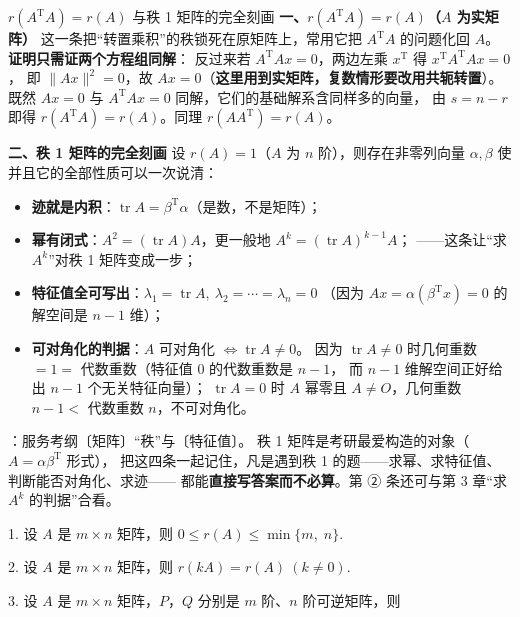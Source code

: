 \begin{fdeep}{$r(A^{\mathrm T}A)=r(A)$ 与秩 1 矩阵的完全刻画}
\textbf{一、$r(A^{\mathrm T}A)=r(A)$（$A$ 为实矩阵）}
这一条把“转置乘积”的秩锁死在原矩阵上，常用它把 $A^{\mathrm T}A$ 的问题化回 $A$。
\textbf{证明只需证两个方程组同解}：
反过来若 $A^{\mathrm T}Ax=0$，两边左乘 $x^{\mathrm T}$ 得 $x^{\mathrm T}A^{\mathrm T}Ax=0$，
即 $\lVert Ax\rVert^{2}=0$，故 $Ax=0$（\textbf{这里用到实矩阵，复数情形要改用共轭转置}）。
既然 $Ax=0$ 与 $A^{\mathrm T}Ax=0$ 同解，它们的基础解系含同样多的向量，
由 $s=n-r$ 即得 $r(A^{\mathrm T}A)=r(A)$。同理 $r(AA^{\mathrm T})=r(A)$。

\textbf{二、秩 1 矩阵的完全刻画}
设 $r(A)=1$（$A$ 为 $n$ 阶），则存在非零列向量 $\alpha,\beta$ 使
并且它的全部性质可以一次说清：
\begin{itemize}[leftmargin=2.2em,itemsep=0.22em]
\item \textbf{迹就是内积}：$\operatorname{tr}A=\beta^{\mathrm T}\alpha$（是数，不是矩阵）；
\item \textbf{幂有闭式}：$A^{2}=(\operatorname{tr}A)A$，更一般地 $A^{k}=(\operatorname{tr}A)^{k-1}A$；
      ——这条让“求 $A^{k}$”对秩 1 矩阵变成一步；
\item \textbf{特征值全可写出}：$\lambda_{1}=\operatorname{tr}A,\ \lambda_{2}=\cdots=\lambda_{n}=0$
      （因为 $Ax=\alpha(\beta^{\mathrm T}x)=0$ 的解空间是 $n-1$ 维）；
\item \textbf{可对角化的判据}：$A$ 可对角化 $\iff \operatorname{tr}A\ne0$。
      因为 $\operatorname{tr}A\ne0$ 时几何重数 $=1=$ 代数重数（特征值 $0$ 的代数重数是 $n-1$，
      而 $n-1$ 维解空间正好给出 $n-1$ 个无关特征向量）；
      $\operatorname{tr}A=0$ 时 $A$ 幂零且 $A\ne O$，几何重数 $n-1<$ 代数重数 $n$，不可对角化。
\end{itemize}
\fbref{}：服务考纲〔矩阵〕“秩”与〔特征值〕。
秩 1 矩阵是考研最爱构造的对象（$A=\alpha\beta^{\mathrm{T}}$ 形式），
把这四条一起记住，凡是遇到秩 1 的题——求幂、求特征值、判断能否对角化、求迹——
都能\textbf{直接写答案而不必算}。第 ② 条还可与第 3 章“求 $A^{k}$ 的判据”合看。
\end{fdeep}


1. 设 $A$ 是 $m\times n$ 矩阵，则 $0\le r(A)\le\min\{m,\;n\}$.

2. 设 $A$ 是 $m\times n$ 矩阵，则 $r(kA)=r(A)\ (k\ne 0)$.

3. 设 $A$ 是 $m\times n$ 矩阵，$P$，$Q$ 分别是 $m$ 阶、$n$ 阶可逆矩阵，则


